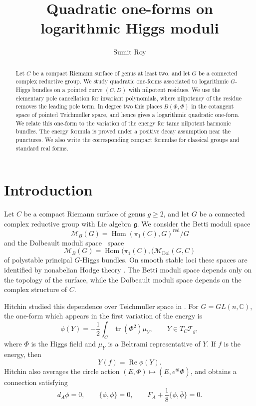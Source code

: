 \documentclass[11pt,reqno]{amsart}
\title[Quadratic one-forms on logarithmic Higgs moduli]{Quadratic one-forms on logarithmic Higgs moduli}
\author{Sumit Roy}
\numberwithin{equation}{section}
\theoremstyle{plain}
\theoremstyle{definition}
\theoremstyle{remark}
\begin{document}
\begin{abstract}
Let \(C\) be a compact Riemann surface of genus at least two, and let \(G\) be a connected complex reductive group. We study quadratic one-forms associated to logarithmic \(G\)-Higgs bundles on a pointed curve \((C,D)\) with nilpotent residues. We use the elementary pole cancellation for invariant polynomials, where nilpotency of the residue removes the leading pole term. In degree two this places \(B(\Phi,\Phi)\) in the cotangent space of pointed Teichmuller space, and hence gives a logarithmic quadratic one-form. We relate this one-form to the variation of the energy for tame nilpotent harmonic bundles. The energy formula is proved under a positive decay assumption near the punctures. We also write the corresponding compact formulae for classical groups and standard real forms.
\end{abstract}


\maketitle



\section{Introduction}

Let \(C\) be a compact Riemann surface of genus \(g\geq2\), and let \(G\) be a
connected complex reductive group with Lie algebra \(\mathfrak g\).  We consider
the Betti moduli space
\[
        \mathcal M_B(G)
        =
        \operatorname{Hom}(\pi_1(C),G)^{\mathrm{red}}/G
\]
and the Dolbeault moduli space \ space
\[
        \mathcal M_B(G)
        =
        \operatorname{Hom}(\pi_1(C),(\mathcal M_{\mathrm{Dol}}(G,C)
        \] of
polystable principal \(G\)-Higgs bundles.  On smooth stable loci these spaces
are identified by nonabelian Hodge theory
\cite{Hitchin1987,Donaldson,Corlette,Simpson1992,Simpson1994I,Simpson1994II}.
The Betti moduli space depends only on the topology of the surface, while the
Dolbeault moduli space depends on the complex structure of \(C\).

Hitchin studied this dependence over Teichmuller space in
\cite{HitchinUniversal}.  For \(G=GL(n,\mathbb C)\), the one-form which appears
in the first variation of the energy is
\[
        \phi(Y)
        =
        -\frac12\int_C\operatorname{tr}(\Phi^2)\mu_Y,
        \qquad
        Y\in T_C\mathcal T_g,
\]
where \(\Phi\) is the Higgs field and \(\mu_Y\) is a Beltrami representative of
\(Y\).  If \(f\) is the energy, then
\[
        Y(f)=\operatorname{Re}\phi(Y).
\]
Hitchin also averages the circle action
\((E,\Phi)\mapsto(E,e^{i\theta}\Phi)\), and obtains a connection satisfying
\[
        d_A\phi=0,\qquad
        \{\phi,\phi\}=0,\qquad
        F_A+\frac18\{\phi,\bar\phi\}=0.
\]
\end{document}
